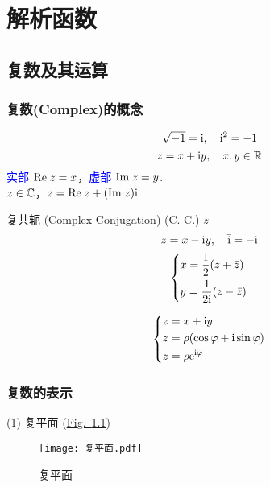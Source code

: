 \documentclass[12pt, a4paper, oneside, UTF8]{ctexbook}
\begin{document}
% 
\else
\fi

\chapter{解析函数}

\section{复数及其运算}

\subsection{复数(Complex)的概念}

\[ \sqrt{-1}=\mathrm{i},\quad{\mathrm{i}}^2=-1 \]
\[z = x + \mathrm{i} y,\quad x,y\in \mathbb{R} \]
\textcolor{blue}{实部} $\mathrm{Re}\;z = x$，\textcolor{blue}{虚部} $\mathrm{Im}\;z = y$.\\
$z\in\mathbb{C}$，$z=\mathrm{Re}\;z+(\mathrm{Im}\;z) \mathrm{i}$

复共轭 (Complex Conjugation) (C. C.) $\bar{z}$
\[\bar{z} = x - \mathrm{i} y,\quad \bar{\mathrm{i}} =-\mathrm{i}\]
\begin{equation} \label{eq:共轭关系}
    \left\{ 
    \begin{lgathered} 
        x = \frac{1}{2}(z + \bar{z})\\ 
        y = \frac{1}{2\mi}(z - \bar{z}) 
    \end{lgathered}   
    \right.
\end{equation}

\begin{equation*}
    \left\{ 
    \begin{lgathered} 
        z = x + \mi y\\ 
        z = \rho (\cos \varphi + \mi \sin \varphi)\\
        z = \rho \me^{\mi\varphi}
    \end{lgathered}   
    \right.
\end{equation*}

\subsection{复数的表示}

\noindent (1) 复平面 (\hyperref[fig:复平面]{Fig.~\ref{fig:复平面}})
\begin{figure}
    \centering
    \texttt{[image: 复平面.pdf]}
    \caption{\label{fig:复平面} 复平面}
\end{figure}
\end{document}
